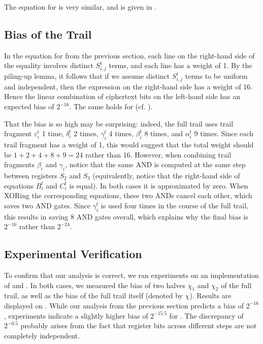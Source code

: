 The equation for \MiniMORUS[640] is very similar, and is given in .

\subsection{Bias of the Trail}
\label{sec:minibias}

In the equation for \MiniMORUS[1280] from the previous section, each line on the right-hand side of the equality involves distinct $S^t_{i,j}$ terms, and each line has a weight of 1. By the piling-up lemma, it follows that if we assume distinct $S^t_{i,j}$ terms to be uniform and independent, then the expression on the right-hand side has a weight of 16. Hence the linear combination of ciphertext bits on the left-hand side has an expected bias of $2^{-16}$. The same holds for \MiniMORUS[640] (cf. ).

That the bias is so high may be surprising: indeed, the full trail uses trail fragment $\varepsilon^t_i$ 1 time, $\delta^t_i$ 2 times, $\gamma^t_i$ 4 times, $\beta^t_i$ 8 times, and $\alpha^t_i$ 9 times. Since each trail fragment has a weight of 1, this would suggest that the total weight should be $1+2+4+8+9 = 24$ rather than 16. However, when combining trail fragments $\beta_i$ and $\gamma_i$, notice that the same AND is computed at the same step between registers $S_2$ and $S_3$ (equivalently, notice that the right-hand side of equations $B^t_i$ and $C^t_i$ is equal). In both cases it is approximated by zero. When XORing the corresponding equations, these two ANDs cancel each other, which saves two AND gates. Since $\gamma^t_i$ is used four times in the course of the full trail, this results in saving 8 AND gates overall, which explains why the final bias is $2^{-16}$ rather than $2^{-24}$.

\subsection{Experimental Verification}

To confirm that our analysis is correct, we ran experiments on an implementation of \MiniMORUS[1280] and \MiniMORUS[640]. In both cases, we measured the bias of two halves $\chi_1$ and $\chi_2$ of the full trail, as well as the bias of the full trail itself (denoted by $\chi$). Results are displayed on .
While our analysis from the previous section predicts a bias of $2^{-16}$, experiments indicate a slightly higher bias of $2^{-15.5}$ for \MORUS[640]. The discrepancy of $2^{-0.5}$ probably arises from the fact that register bits across different steps are not completely independent.

